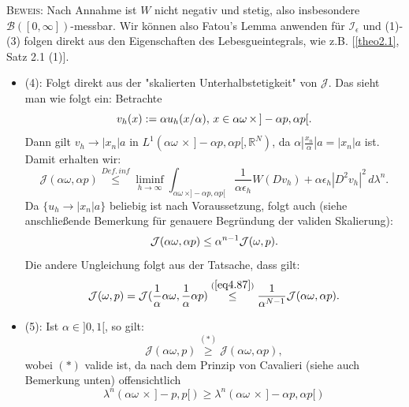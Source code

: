 \textsc{Beweis:} Nach Annahme ist \(W\) nicht negativ und stetig, also insbesondere \(\mathcal{B}([0,\infty])\)-messbar. Wir können also Fatou's Lemma anwenden für \(\mathcal{I}_{\epsilon}\) und (1)-(3) folgen direkt aus den Eigenschaften des Lebesgueintegrals, wie z.B. [\ref{theo2.1}, Satz 2.1 (1)].
\begin{itemize}
    \item (4): Folgt direkt aus der "skalierten Unterhalbstetigkeit" von \(\mathcal{J}\). Das sieht man wie folgt ein: Betrachte
    \begin{equation}{\label{eq4.85}}
        v_h(x) := \alpha u_h(x/ \alpha), \, x \in \alpha \omega \, \times \, ]-\alpha p, \alpha p[.
    \end{equation}
    Dann gilt \(v_h \to |x_n|a\) in \(L^1(\alpha \omega \, \times \, ]-\alpha p, \alpha p[, \mathbb{R}^N)\), da \(\alpha |\frac{x_n}{\alpha}|a = |x_n|a\) ist. Damit erhalten wir:
    \begin{equation}
        \mathcal{J}(\alpha \omega,\alpha p) \stackrel{Def. \, inf}{\leq} \liminf_{h \to \infty} \int_{\alpha \omega \, \times ]-\alpha p,\alpha p[} \frac{1}{\alpha \epsilon_h} W(Dv_h) + \alpha \epsilon_h |D^2 v_h|^2 \, d\lambda^n.
    \end{equation}
    Da \(\{u_h \to |x_n|a\}\) beliebig ist nach Voraussetzung, folgt auch (siehe anschließende Bemerkung für genauere Begründung der validen Skalierung):
    \begin{equation}{\label{eq4.87}}
        \mathcal{J}(\alpha \omega, \alpha p) \leq \alpha^{n-1} \mathcal{J}(\omega,p).
    \end{equation}
    Die andere Ungleichung folgt aus der Tatsache, dass gilt:
    \begin{equation}
        \mathcal{J}(\omega,p) = \mathcal{J}(\frac{1}{\alpha}\alpha \omega, \frac{1}{\alpha}\alpha p) \stackrel{(\ref{eq4.87})}{\leq} \frac{1}{\alpha^{N-1}} \mathcal{J}(\alpha \omega, \alpha p).
    \end{equation}
    \item (5): Ist \(\alpha \in ]0,1[\), so gilt:
    \begin{equation}
        \mathcal{J}(\alpha \omega, p) \stackrel{(*)}{\geq} \mathcal{J}(\alpha \omega, \alpha p),
    \end{equation}
    wobei \((*)\) valide ist, da nach dem Prinzip von Cavalieri (siehe auch Bemerkung unten) offensichtlich 
    \begin{equation}
        \lambda^n(\alpha \omega \, \times \, ]-p,p[) \geq \lambda^n(\alpha \omega \, \times \, ]-\alpha p, \alpha p[)

\end{equation}
\end{itemize}
